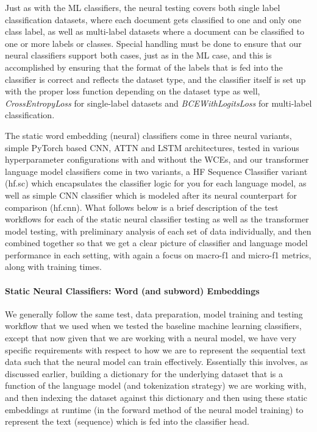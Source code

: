 \documentclass[final]{clv2025-revised}
\begin{document}
Just as with the ML classifiers, the neural testing covers both single label classification datasets, where each document gets classified to one and only one class label, as well as multi-label datasets where a document can be classified to one or more labels or classes. Special handling must be done to ensure that our neural classifiers support both cases, just as in the ML case, and this is accomplished by ensuring that the format of the labels that is fed into the classifier is correct and reflects the dataset type, and the classifier itself is set up with the proper loss function depending on the dataset type as well, \textit{CrossEntropyLoss} for single-label datasets and \textit{BCEWithLogitsLoss} for multi-label classification.

The static word embedding (neural) classifiers come in three neural variants, simple PyTorch based CNN, ATTN and LSTM architectures, tested in various hyperparameter configurations with and without the WCEs, and our transformer language model classifiers come in two variants, a HF Sequence Classifier variant (hf.sc) which encapsulates the classifier logic for you for each language model, as well as simple CNN classifier which is modeled after its neural counterpart for comparison (hf.cnn). What follows below is a brief description of the test workflows for each of the static neural classifier testing as well as the transformer model testing, with preliminary analysis of each set of data individually, and then combined together so that we get a clear picture of classifier and language model performance in each setting, with again a focus on macro-f1 and micro-f1 metrics, along with training times. 

\paragraph{Static Neural Classifiers: Word (and subword) Embeddings}
We generally follow the same test, data preparation, model training and testing workflow that we used when we tested the baseline machine learning classifiers, except that now given that we are working with a neural model, we have very specific requirements with respect to how we are to represent the sequential text data such that the neural model can train effectively. Essentially this involves, as discussed earlier, building a dictionary for the underlying dataset that is a function of the language model (and tokenization strategy) we are working with, and then indexing the dataset against this dictionary and then using these static embeddings at runtime (in the forward method of the neural model training) to represent the text (sequence) which is fed into the classifier head.
\end{document}
